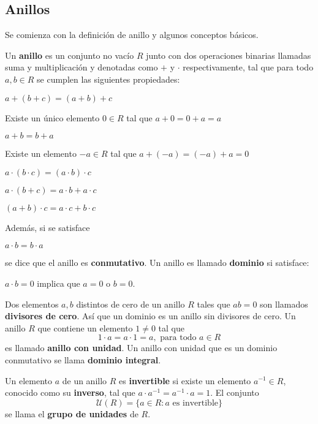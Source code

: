 \subsection{Anillos}
Se comienza con la definición de anillo y algunos conceptos básicos.
\begin{definicion}
Un \textbf{anillo} es un conjunto no vacío $R$ junto con dos operaciones binarias llamadas suma y multiplicación y denotadas como $+$ y $\cdot$ respectivamente, tal que para todo $a,b\in R$ se cumplen las siguientes propiedades:
\begin{bulletList}
\item $a+(b+c) = (a+b)+c$
\item Existe un único elemento $0\in R$ tal que $a+0=0+a=a$
\item $a+b=b+a$
\item Existe un elemento $-a\in R$ tal que $a+(-a) = (-a)+a=0$
\item $a\cdot(b\cdot c) = (a\cdot b)\cdot c$
\item $a\cdot(b+c) = a\cdot b+ a\cdot c$
\item $(a+b)\cdot c= a\cdot c+b\cdot c $
\end{bulletList}
Además, si se satisface
\begin{bulletList}\addtocounter{ContadorLista}{7}
\item $a \cdot b = b\cdot a$
\end{bulletList}
se dice que el anillo es \textbf{conmutativo}.
Un anillo es llamado  \textbf{dominio} si satisface:
\begin{bulletList}\addtocounter{ContadorLista}{8}
\item $a\cdot b = 0$ implica que $a = 0$  o $b = 0$.
\end{bulletList}
\end{definicion}
Dos elementos $a,b$ distintos de cero de un anillo $R$ tales que $ab = 0$ son llamados \textbf{divisores de cero}. Así que un dominio es un anillo sin divisores de cero.
Un anillo $R$ que contiene un elemento $1\neq 0$ tal que \[ 1\cdot a = a \cdot 1 = a, \mbox{ para todo } a \in R \] es llamado \textbf{anillo con unidad}. Un anillo con unidad que es un dominio conmutativo se llama \textbf{dominio integral}.
\begin{definicion}
Un elemento $a$ de un anillo $R$ es \textbf{invertible} si existe un elemento $a^{-1} \in R$, conocido como su \textbf{inverso}, tal que $a\cdot a^{-1} = a^{-1} \cdot a = 1$. El conjunto \[ \mathcal{U}(R) = \{a \in R \colon a \mbox{ es invertible} \} \] se llama el \textbf{grupo de unidades} de $R$.
\end{definicion}
